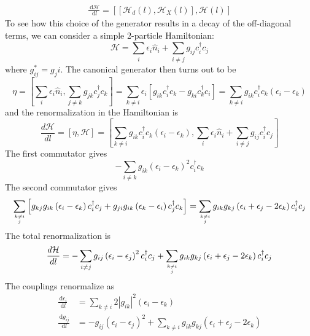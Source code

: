 \documentclass[twoside]{report}
\numberwithin{equation}{section}
\begin{document}
\begin{equation}\begin{aligned}
	\label{cut}
	\frac{\:\mathrm{d}\mathcal{H}}{\:\mathrm{d}l} = \left[\left[\mathcal{H}_d(l),\mathcal{H}_X(l)\right],\mathcal{H}(l)\right]
\end{aligned}\end{equation}
To see how this choice of the generator results in a decay of the off-diagonal terms, we can consider a simple 2-particle Hamiltonian:
\begin{equation}
	\mathcal{H} = \sum_i \epsilon_i \hat n_i + \sum_{i\neq j} g_{ij}c^\dagger_i c_j
\end{equation}
where \(g_{ij}^* = g_ji\). The canonical generator then turns out to be 
\begin{equation}
	\eta = \left[\sum_i \epsilon_i \hat n_i, \sum_{j\neq k} g_{jk}c^\dagger_j c_k\right] = \sum_{k\neq i} \epsilon_i\left[g_{ik}c^\dagger_i c_k - g_{ki}c^\dagger_k c_i\right] = \sum_{k\neq i} g_{ik}c^\dagger_i c_k \left(\epsilon_i - \epsilon_k\right)
\end{equation}
and the renormalization in the Hamiltonian is
\begin{equation}
	\frac{d\mathcal{H}}{dl} = \left[\eta, \mathcal{H}\right] = \left[\sum_{k\neq i} g_{ik}c^\dagger_i c_k \left(\epsilon_i - \epsilon_k\right), \sum_i \epsilon_i \hat n_i + \sum_{i\neq j} g_{ij}c^\dagger_i c_j\right]
\end{equation}
The  first commutator gives 
\begin{equation}
	-\sum_{i\neq k} g_{ik}\left(\epsilon_i - \epsilon_k\right)^2 c^\dagger_i c_k
\end{equation}
The second commutator gives
\begin{equation}
	\sum_{k\neq i\atop{j}}\left[g_{kj}g_{ik}\left(\epsilon_i - \epsilon_k\right) c^\dagger_i c_j + g_{ji}g_{ik}\left( \epsilon_k - \epsilon_i \right) c^\dagger_j c_k\right] = \sum_{k\neq i\atop{j}}g_{ik}g_{kj}\left( \epsilon_i + \epsilon_j - 2\epsilon_k \right) c^\dagger_i c_j
\end{equation}
The total renormalization is
\begin{equation}
	\frac{d\mathcal{H}}{dl} = -\sum_{i\neq j} g_{ij}\left(\epsilon_i - \epsilon_j\right)^2 c^\dagger_i c_j + \sum_{k\neq i\atop{j}}g_{ik}g_{kj}\left( \epsilon_i + \epsilon_j - 2\epsilon_k \right) c^\dagger_i c_j
\end{equation}
The couplings renormalize as
\begin{equation}\begin{aligned}
	\frac{\:\mathrm{d}\epsilon_i}{\:\mathrm{d}l} &= \sum_{k \neq i} 2|g_{ik}|^2\left( \epsilon_i - \epsilon_k \right)\\
	\frac{\:\mathrm{d}g_{ij}}{\:\mathrm{d}l} &= - g_{ij}\left(\epsilon_i - \epsilon_j\right)^2 + \sum_{k \neq i}g_{ik}g_{kj}\left( \epsilon_i + \epsilon_j - 2\epsilon_k \right)
\end{aligned}\end{equation}
\end{document}
